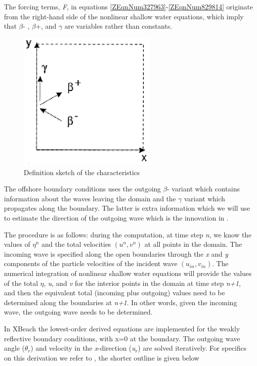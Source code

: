 The forcing terms, \textit{F}, in equations \eqref{ZEqnNum327963}-\eqref{ZEqnNum829814} originate from the right-hand side of the nonlinear shallow water equations, which imply that $\beta $- , $\beta $+, and $\gamma $ are variables rather than constants.  

\begin{figure}[h]
  \centering
  \includegraphics[width=0.6\textwidth]{image11} 
  \caption{Definition sketch of the characteristics}
  \label{fig:image11} 
\end{figure}

The offshore boundary conditions uses the outgoing $\beta $- variant which contains information about the waves leaving the domain and the $\gamma $ variant which propagates along the boundary. The latter is extra information which we will use to estimate the direction of the outgoing wave which is the innovation in \citet{VanDongeren1997}.

The procedure is as follows: during the computation, at time step \textit{n}, we know the values of $\eta^n$ and the total velocities $(u^n,v^n)$ at all points in the domain.  The incoming wave is specified along the open boundaries through the \textit{x} and \textit{y} components of the particle velocities of the incident wave $(u_{in},v_{in})$.  The numerical integration of nonlinear shallow water equations will provide the values of the total $\eta$, \textit{u}, and \textit{v} for the interior points in the domain at time step \textit{n+1}, and then the equivalent total (incoming plus outgoing) values need to be determined along the boundaries at \textit{n+1}.  In other words, given the incoming wave, the outgoing wave needs to be determined. 

In XBeach the lowest-order derived equations are implemented for the weakly reflective boundary conditions, with x=0 at the boundary.  The outgoing wave angle (\textit{$\theta $${}_{r}$})  and velocity in the \textit{x}-direction (\textit{u${}_{r}$})  are solved iteratively.  For specifics on this derivation we refer to \citet{VanDongeren1997}, the shorter outline is given below

